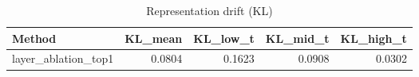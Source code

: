 \begin{table}[htbp]
\centering
\caption{Representation drift (KL)}
\label{tab:repr-drift}
\begin{tabular}{lrrrr}
\toprule
\textbf{Method} & \textbf{KL\_mean} & \textbf{KL\_low\_t} & \textbf{KL\_mid\_t} & \textbf{KL\_high\_t} \\
\midrule
layer\_ablation\_top1 & 0.0804 & 0.1623 & 0.0908 & 0.0302 \\
\bottomrule
\end{tabular}
\end{table}